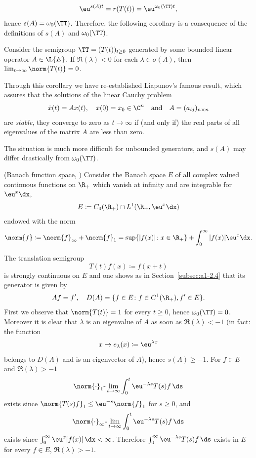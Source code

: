 \[
    \eu^{s(A)t} = r(T(t)) = \eu^{\omega_{0}(\TT) t} ,
\]
hence $s(A) = \omega_{0}(\TT)$.
Therefore, the following corollary is a consequence of the definitions of\/ $s(A)$ and $\omega_{0}(\TT)$.
\begin{corollary}\label{cor:a3-1.2}
Consider the semigroup $\TT = (T(t))_{t \geq 0}$ generated by some bounded linear operator $A \in \L{E}$.
If\/ $\Re(\lambda) < 0$ for each $\lambda \in \sigma(A)$, then 
\mbox{$\lim_{t \to \infty}\norm{T(t)} = 0$.}
\end{corollary}
Through this corollary we have re-established Liapunov's  famous result, which assures that the solutions of the linear Cauchy problem
\[
    \dot{x}(t) = Ax(t), \quad x(0) = x_{0} \in \C^{n} \quad \text{and} \quad A = (a_{ij})_{n\times n}
\]
are \emph{stable}, \ie they converge to zero as $t \to \infty$ if (and only if) the real parts of all eigenvalues of the matrix $A$ are less than zero.

The situation is much more difficult for unbounded generators, and $s(A)$ may differ drastically from $\omega_{0}(\TT)$.
\begin{example}\label{ex:a3-1.3}(Banach function space, \textcite{greinervoigtwolff:1981})
Consider the Banach space $E$ of all complex valued continuous functions on $\R_{+}$ which vanish at infinity and are integrable for $\eu^{x}\dx$, \ie 
\[
    E \coloneqq C_{0}(\R_{+}) \cap L^{1}(\R_{+}, \eu^{x}\dx)
\]
endowed with the norm
\[
    \norm{f} \coloneqq \norm{f}_{\infty} + \norm{f}_{1} = \sup\{|f(x)| \colon x \in \R_{+}\} + \int_{0}^{\infty} |f(x)|\eu^{x} \dx .
\]
\end{example}
The translation semigroup
\[
    T(t)f(x) \coloneqq f(x+t)
\]
is strongly continuous on $E$ and one shows as in Section~\ref{subsec:a1-2.4} that its generator is given by
\[
    Af = f', \quad D(A) = \{ f \in E \colon f \in C^{1}(\R_{+}), f' \in E \} .
\]
First we observe that $\norm{T(t)} = 1$ for every $t \geq 0$, hence $\omega_{0}(\TT) = 0$.
Moreover it is clear that $\lambda$ is an eigenvalue of\/ $A$ as soon as $\Re(\lambda) < -1$ (in fact: the function
\[
    x \mapsto e_{\lambda}(x) \coloneqq \eu^{\lambda x}
\]
belongs to $D(A)$ and is an eigenvector of\/ $A$), hence $s(A) \geq -1$.
For $f \in E$ and $\Re(\lambda) > -1$ 
\[
    \norm{\cdot}_{1}\text{-}\lim_{t \to \infty} \int_{0}^{t} \eu^{-\lambda s}T(s)f \, \ds
\]
exists since $\norm{T(s)f}_{1} \leq \eu^{-s}\norm{f}_{1}$ for $s \geq 0$, and
\[
    \norm{\cdot}_{\infty}\text{-}\lim_{t \to \infty} \int_{0}^{t} \eu^{-\lambda s}T(s)f \, \ds
\]
exists since $\int_{0}^{\infty} \eu^{x}|f(x)| \, \dx < \infty$.
Therefore $\int_{0}^{\infty} \eu^{-\lambda s}T(s)f \, \ds$ exists in $E$ for every $f \in E$, $\Re(\lambda) > -1$.

